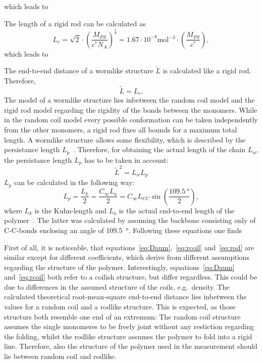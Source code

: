 which leads to \par 
\centerline{} \par
The length of a rigid rod can be calculated as
\begin{equation}
    L_r = \sqrt{2} \cdot (\frac{M_{PS}}{c^*N_A})^\frac{1}{3} = 1.67 \cdot 10^{-8} \si{\mol^{-3}} \cdot (\frac{M_{PS}}{c^*}),
    \label{eq:rod}
\end{equation}
which leads to \par 
\centerline{} \par
The end-to-end distance of a wormlike structure $\widetilde{L}$ is calculated like a rigid rod. Therefore, 
\begin{equation}
    \widetilde{L} = L_r.
\end{equation} 
The model of a wormlike structure lies inbetween the random coil model and the rigid rod model regarding the rigidity of the bonds between the monomers. While in the random coil model every possible conformation can be taken independently from the other monomers, a rigid rod fixes all bounds for a maximum total length. A wormlike structure allows some flexibility, which is described by the persistance length $L_p$~\cite{Ying.1987}. Therefore, for obtaining the actual length of the chain $L_w$, the persistance length $L_p$ has to be taken in account: 
\begin{equation}
    \widetilde{L}^2 = L_w L_p
\end{equation}
$L_p$ can be calculated in the following way:
\begin{equation}
    L_p = \frac{L_k}{2} = \frac{C_{\infty}L_a}{2} = C_{\infty}L_{CC}\sin(\frac{\SI{109.5}{\degree}}{2}),
    \label{eq:Lpers}
\end{equation}
where $L_k$ is the Kuhn-length and $L_a$ is the actual end-to-end length of the polymer~\cite{Koltzenburg.2013}. The latter was calculated by assuming the backbone consisting only of C-C-bonds enclosing an angle of \SI{109.5}{\degree}. Following these equations one finds \par 
\centerline{} \par
First of all, it is noticeable, that equations~\ref{eq:Daum},~\ref{eq:rcoil} and~\ref{eq:rod} are similar except for different coefficients, which derive from different assumptions regarding the structure of the polymer. Interestingly, equations~\ref{eq:Daum} and~\ref{eq:rcoil} both refer to a coilish structure, but differ regardless. This could be due to differences in the assumed structure of the coils, e.g.~density. The calculated theoretical root-mean-square end-to-end distance lies inbetween the values for a random coil and a rodlike structure. This is expected, as those structurs both resemble one end of an extremum: The random coil structure assumes the single monomeres to be freely joint without any restiction regarding the folding, whilst the rodlike structure assumes the polymer to fold into a rigid line. Therefore, also the structure of the polymer used in the measurement should lie between random coil and rodlike. \par 
